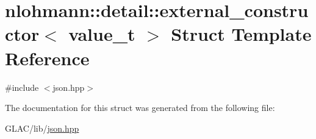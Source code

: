 \hypertarget{structnlohmann_1_1detail_1_1external__constructor}{}\section{nlohmann\+::detail\+::external\+\_\+constructor$<$ value\+\_\+t $>$ Struct Template Reference}
\label{structnlohmann_1_1detail_1_1external__constructor}


{\ttfamily \#include $<$json.\+hpp$>$}



The documentation for this struct was generated from the following file\+:\begin{DoxyCompactItemize}
\item 
G\+L\+A\+C/lib/\mbox{\hyperlink{json_8hpp}{json.\+hpp}}\end{DoxyCompactItemize}
